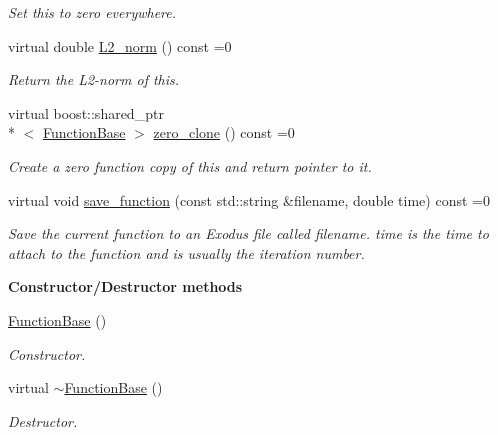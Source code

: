 \begin{DoxyCompactItemize}
\begin{DoxyCompactList}\small\item\em Set {\ttfamily this} to zero everywhere. \end{DoxyCompactList}\item 
virtual double \hyperlink{class_q_u_e_s_o_1_1_function_base_a0aaac902156559c64708cd41497bff2d}{L2\-\_\-norm} () const =0
\begin{DoxyCompactList}\small\item\em Return the L2-\/norm of {\ttfamily this}. \end{DoxyCompactList}\item 
virtual boost\-::shared\-\_\-ptr\\*
$<$ \hyperlink{class_q_u_e_s_o_1_1_function_base}{Function\-Base} $>$ \hyperlink{class_q_u_e_s_o_1_1_function_base_a238b9b8fc5cd901cac7e8df3018bd170}{zero\-\_\-clone} () const =0
\begin{DoxyCompactList}\small\item\em Create a zero function copy of {\ttfamily this} and return pointer to it. \end{DoxyCompactList}\item 
virtual void \hyperlink{class_q_u_e_s_o_1_1_function_base_aa7e4f6011f7787ad9e01fab3260fa798}{save\-\_\-function} (const std\-::string \&filename, double time) const =0
\begin{DoxyCompactList}\small\item\em Save the current function to an Exodus file called {\ttfamily filename}. {\ttfamily time} is the time to attach to the function and is usually the iteration number. \end{DoxyCompactList}\end{DoxyCompactItemize}
\begin{Indent}{\bf Constructor/\-Destructor methods}\par
\begin{DoxyCompactItemize}
\item 
\hyperlink{class_q_u_e_s_o_1_1_function_base_adf2e807076f9630fe281485527e443f3}{Function\-Base} ()
\begin{DoxyCompactList}\small\item\em Constructor. \end{DoxyCompactList}\item 
virtual \hyperlink{class_q_u_e_s_o_1_1_function_base_a387bb45998e02219a06a1d3a8280f7ad}{$\sim$\-Function\-Base} ()
\begin{DoxyCompactList}\small\item\em Destructor. \end{DoxyCompactList}\end{DoxyCompactItemize}
\end{Indent}


